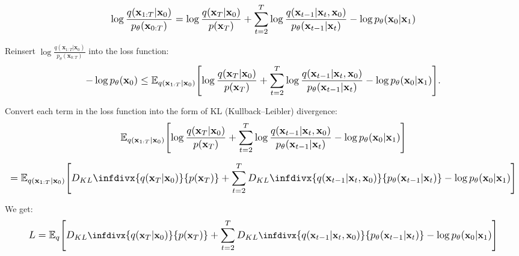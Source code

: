 \documentclass{article}
\newcommand{\infdiv}{D_{KL}\infdivx}
\newcommand*{\Scale}[2][4]{\scalebox{#1}{\ensuremath{#2}}}
\begin{document}
\begin{equation}
\Scale[1.2]{ \displaystyle \log \frac{q(\textbf{x}_{1:T}|\textbf{x}_0)}{p_\theta(\textbf{x}_{0:T})} = \log \frac{
q(\textbf{x}_T|\textbf{x}_0)
} 
{ 
p(\textbf{x}_T)
} + 
\sum_{t=2}^{T} \log \frac{
q(\textbf{x}_{t-1}|\textbf{x}_t,\textbf{x}_0)
}
{
p_\theta(\textbf{x}_{t-1}|\textbf{x}_{t})
} -
\log p_\theta(\textbf{x}_0|\textbf{x}_1)
}
\end{equation}

Reinsert $ \log \frac{q(\textbf{x}_{1:T}|\textbf{x}_0)}{p_\theta(\textbf{x}_{0:T})} $  into the loss function:
\begin{equation}
\Scale[1.2]{ \displaystyle -\log p_\theta(\textbf{x}_0) \leq \mathbb{E}_{q(\textbf{x}_{1:T}|\textbf{x}_0)} \left[ 
\log \frac{
q(\textbf{x}_T|\textbf{x}_0)
} 
{ 
p(\textbf{x}_T)
} + 
\sum_{t=2}^{T} \log \frac{
q(\textbf{x}_{t-1}|\textbf{x}_t,\textbf{x}_0)
}
{
p_\theta(\textbf{x}_{t-1}|\textbf{x}_{t})
} -
\log p_\theta(\textbf{x}_0|\textbf{x}_1)
\right]. }
\end{equation}

Convert each term in the loss function into the form of KL (Kullback–Leibler) divergence:
\begin{equation}
\Scale[1.2]{ \displaystyle
\mathbb{E}_{q(\textbf{x}_{1:T}|\textbf{x}_0)} \left[ 
\log \frac{
q(\textbf{x}_T|\textbf{x}_0)
} 
{ 
p(\textbf{x}_T)
} + 
\sum_{t=2}^{T} \log \frac{
q(\textbf{x}_{t-1}|\textbf{x}_t,\textbf{x}_0)
}
{
p_\theta(\textbf{x}_{t-1}|\textbf{x}_{t})
} -
\log p_\theta(\textbf{x}_0|\textbf{x}_1)
\right] 
}
\end{equation}

\begin{equation}
\Scale[1.2]{ \displaystyle = 
\mathbb{E}_{q(\textbf{x}_{1:T}|\textbf{x}_0)} \left[ 
\infdiv{q(\textbf{x}_T|\textbf{x}_0)}{p(\textbf{x}_T)}
+ 
\sum_{t=2}^{T} \infdiv{ 
q(\textbf{x}_{t-1}|\textbf{x}_t,\textbf{x}_0)
}
{
p_\theta(\textbf{x}_{t-1}|\textbf{x}_{t})
}
-
\log p_\theta(\textbf{x}_0|\textbf{x}_1)
\right]
}
\end{equation}

We get:
\begin{equation}
\Scale[1.2]{ \displaystyle
{\small L = 
\mathbb{E}_{q} \left[ 
\infdiv{q(\textbf{x}_T|\textbf{x}_0)}{p(\textbf{x}_T)}
+ 
\sum_{t=2}^{T} \infdiv{ 
q(\textbf{x}_{t-1}|\textbf{x}_t,\textbf{x}_0)
}
{
p_\theta(\textbf{x}_{t-1}|\textbf{x}_{t})
}
-
\log p_\theta(\textbf{x}_0|\textbf{x}_1)
\right]
} }
\end{equation}
\end{document}
